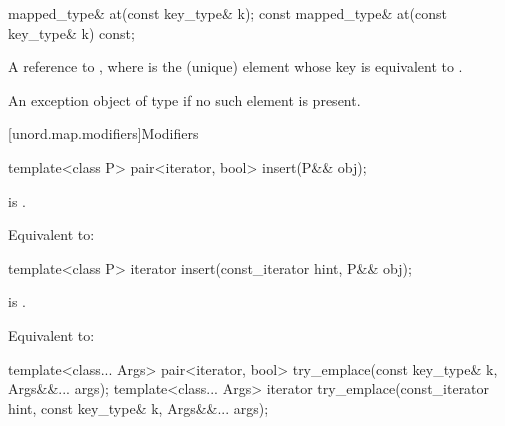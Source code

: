 %
%
\begin{itemdecl}
mapped_type& at(const key_type& k);
const mapped_type& at(const key_type& k) const;
\end{itemdecl}

\begin{itemdescr}
\pnum
\returns
A reference to , where  is the (unique) element whose key is equivalent to .

\pnum
\throws
An exception object of type  if no such element is present.
\end{itemdescr}

[unord.map.modifiers]{Modifiers}

%
\begin{itemdecl}
template<class P>
  pair<iterator, bool> insert(P&& obj);
\end{itemdecl}

\begin{itemdescr}

\pnum
\constraints
{} is .

\pnum
\effects
Equivalent to: 
\end{itemdescr}

%
\begin{itemdecl}
template<class P>
  iterator insert(const_iterator hint, P&& obj);
\end{itemdecl}

\begin{itemdescr}
\pnum
\constraints
{} is .

\pnum
\effects
Equivalent to:
\end{itemdescr}

%
\begin{itemdecl}
template<class... Args>
  pair<iterator, bool> try_emplace(const key_type& k, Args&&... args);
template<class... Args>
  iterator try_emplace(const_iterator hint, const key_type& k, Args&&... args);
\end{itemdecl}


